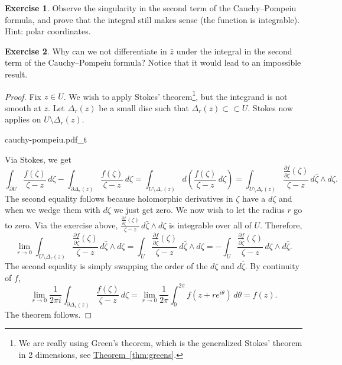 \documentclass[12pt,openany]{book}
\theoremstyle{plain}
\theoremstyle{remark}
\theoremstyle{definition}
\newenvironment{exbox}{%
    \def\FrameCommand{\vrule width 1pt \relax\hspace{10pt}}%
    \MakeFramed {\advance \hsize -\width \FrameRestore}%
}{%
    \endMakeFramed
}
\newenvironment{myfig}{%
    \begin{center}
}{%
    \end{center}
}
\theoremstyle{exercise}
\newtheorem{exercise}{Exercise}[section]
\theoremstyle{example}
\newcommand{\thmref}[1]{\hyperref[#1]{Theorem~\ref*{#1}}}
\begin{document}
\begin{exbox}
\begin{exercise}
Observe the singularity in the second term of the Cauchy--Pompeiu formula,
and prove that the integral still makes
sense (the function is integrable).  Hint: polar coordinates.
\end{exercise}

\begin{exercise}
Why can we not differentiate in $\bar{z}$ under the integral in the second
term of the Cauchy--Pompeiu formula?
Notice that it would lead to an impossible result.
\end{exercise}
\end{exbox}

\begin{proof}
Fix $z \in U$.  We wish to apply Stokes' theorem\footnote{%
We are really using Green's theorem, which is the generalized
Stokes' theorem in 2 dimensions, see \thmref{thm:greens}.},
but the integrand is not smooth at $z$.
Let $\Delta_r(z)$ be a small disc such that
$\Delta_r(z) \subset
\subset U$.  Stokes now applies on $U \setminus \Delta_r(z)$.

\begin{myfig}
{cauchy-pompeiu.pdf_t}
\end{myfig}

Via Stokes, we get
\begin{equation*}
\int_{\partial U} \frac{f(\zeta)}{\zeta-z}\,  d\zeta - 
\int_{\partial \Delta_r(z)} \frac{f(\zeta)}{\zeta-z}\,  d\zeta
=
\int_{U \setminus \Delta_r(z)} d\left( \frac{f(\zeta)}{\zeta-z} \, d\zeta \right)
=
\int_{U \setminus \Delta_r(z)} \frac{\frac{\partial f}{\partial
\bar{\zeta}}(\zeta)}{\zeta-z} \, d\bar{\zeta} \wedge d\zeta .
\end{equation*}
The second equality follows because holomorphic derivatives in $\zeta$
have a $d\zeta$ and when we wedge them with $d\zeta$ we just get zero.
We now wish to let the radius $r$ go to zero.
Via the exercise above,
$\frac{\frac{\partial f}{\partial \bar{\zeta}}(\zeta)}{\zeta-z} \, d\bar{\zeta} \wedge d\zeta$
is integrable over all of $U$.  Therefore,
\begin{equation*}
\lim_{r \to 0}
\int_{U \setminus \Delta_r(z)} \frac{\frac{\partial f}{\partial
\bar{\zeta}}(\zeta)}{\zeta-z} \, d\bar{\zeta} \wedge d\zeta
=
\int_{U} \frac{\frac{\partial f}{\partial
\bar{\zeta}}(\zeta)}{\zeta-z} \, d\bar{\zeta} \wedge d\zeta
=
-
\int_{U} \frac{\frac{\partial f}{\partial
\bar{\zeta}}(\zeta)}{\zeta-z} \, d\zeta \wedge d\bar{\zeta} .
\end{equation*}
The second equality is simply swapping the order of the $d\zeta$ and
$d\bar{\zeta}$.
By continuity of $f$,
\begin{equation*}
\lim_{r \to 0}
\frac{1}{2\pi i}
\int_{\partial \Delta_r(z)} \frac{f(\zeta)}{\zeta-z}\,  d\zeta
=
\lim_{r \to 0}
\frac{1}{2\pi}
\int_0^{2\pi} f(z + r e^{i\theta})\, d\theta
=
f(z) .
\end{equation*}
The theorem follows.
\end{proof}
\end{document}
